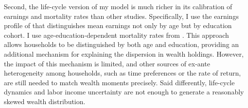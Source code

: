 \par Second, the life-cycle version of my model is much richer in its calibration of earnings and mortality rates than other studies. Specifically, I use the earnings profile of \cite{Cagetti2003} that distinguishes mean earnings not only by age but by education cohort. I use age-education-dependent mortality rates from \cite{Brown2007}. This approach allows households to be distinguished by both age and education, providing an additional mechanism for explaining the dispersion in wealth holdings. However, the impact of this mechanism is limited, and other sources of ex-ante heterogeneity among households, such as time preferences or the rate of return, are still needed to match wealth moments precisely. Said differently, life-cycle dynamics and labor income uncertainty are not enough to generate a reasonably skewed wealth distribution. 

